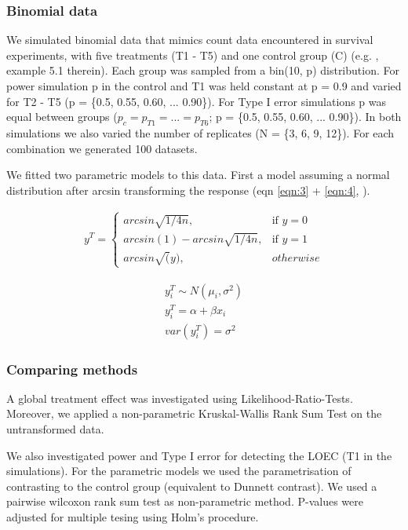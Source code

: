 \documentclass{scrartcl}\usepackage[]{graphicx}\usepackage[]{color}
\begin{document}

\subsubsection{Binomial data}
We simulated binomial data that mimics count data encountered in survival experiments, with five treatments (T1 - T5) and one control group (C) (e.g. \citep{newman_quantitative_2012}, example 5.1 therein).
Each group was sampled from a bin(10, p) distribution.
For power simulation p in the control and T1 was held constant at p = 0.9 and varied for T2 - T5  (p = \{0.5, 0.55, 0.60, ... 0.90\}).
For Type I error simulations p was equal between groups ($p_c = p_{T1} = ... = p_{T6}$; p = \{0.5, 0.55, 0.60, ... 0.90\}).
In both simulations we also varied the number of replicates (N = \{3, 6, 9, 12\}).
For each combination we generated 100 datasets.

We fitted two parametric models to this data.
First a model assuming a normal distribution after arcsin transforming the response (eqn \ref{eqn:3} + \ref{eqn:4}, \citep{epa_methods_2002}).

\begin{align}
  y^T = 
  \begin{cases}
    arcsin \sqrt{1/4n}, & \text{if } y = 0 \\
    arcsin(1) - arcsin \sqrt{1/4n}, & \text{if } y = 1 \\
    arcsin \sqrt(y), & otherwise
  \end{cases}
  \label{eqn:3}
\end{align}

\begin{align}
  y^T_i \sim N(\mu_i, \sigma^2) \nonumber \\
  y^T_i = \alpha + \beta x_i \label{eqn:4} \\
  var(y^T_i) = \sigma^2 \nonumber
\end{align}


\subsubsection{Comparing methods}
A global treatment effect was investigated using Likelihood-Ratio-Tests.
Moreover, we applied a non-parametric Kruskal-Wallis Rank Sum Test on the untransformed data.

We also investigated power and Type I error for detecting the LOEC (T1 in the simulations).
For the parametric models we used the parametrisation of contrasting to the control group (equivalent to Dunnett contrast).
We used a pairwise wilcoxon rank sum test as non-parametric method.
P-values were adjusted for multiple tesing using Holm's procedure.
\end{document}
